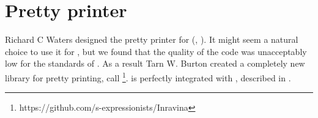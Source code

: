 \chapter{Pretty printer}

Richard C Waters designed the pretty printer for
\commonlisp{} (\cite{Waters89xp:a}, \cite{Waters:1992:UNC:1039991.1039996}).
It might seem a natural choice to use it for \sysname{}, but we found
that the quality of the code was unacceptably low for the standards of
\sysname{}.  As a result Tarn W. Burton created a completely new
library for pretty printing, call \inravina{}%
\footnote{https://github.com/s-expressionists/Inravina}.  \inravina{}
is perfectly integrated with \incless{}, described in
.
